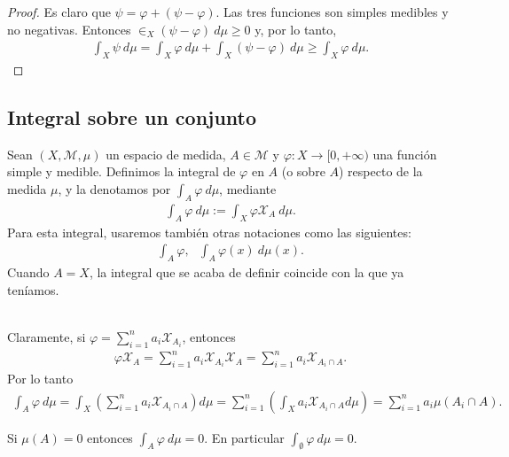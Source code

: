 \begin{proof}
Es claro que $\psi = \varphi + (\psi - \varphi)$. Las tres funciones son simples medibles y no negativas. Entonces $\in_{X}{(\psi - \varphi) \ d\mu} \ge 0$ y, por lo tanto,
\begin{align*}
    \int_{X}{\psi \ d\mu} = \int_{X}{\varphi \ d\mu} + \int_{X}{(\psi - \varphi) \ d\mu} \ge \int_{X}{\varphi \ d\mu}.
\end{align*}
\end{proof}

\subsection{Integral sobre un conjunto}

\begin{defi}
Sean $(X, \mathcal{M}, \mu)$ un espacio de medida, $A \in \mathcal{M}$ y $\varphi: X \longrightarrow [0, +\infty)$ una función simple y medible. Definimos la integral de $\varphi$ en $A$ (o sobre $A$) respecto de la medida $\mu$, y la denotamos por $\int_{A}{\varphi \ d\mu}$, mediante
\begin{align*}
    \int_{A}{\varphi \ d\mu} := \int_{X}{\varphi \mathcal{X}_A \ d\mu}.
\end{align*}
Para esta integral, usaremos también otras notaciones como las siguientes:
\begin{align*}
    \int_{A}{\varphi}, \ \ \ \int_{A}{\varphi(x) \ d\mu(x)}.
\end{align*}
Cuando $A = X$, la integral que se acaba de definir coincide con la que ya teníamos.
\end{defi}
\\
\newline
Claramente, si $\varphi = \sum_{i=1}^{n}{a_i \mathcal{X}_{A_i}}$, entonces
\begin{align*}
    \varphi \mathcal{X}_A = \sum_{i=1}^{n}{a_i \mathcal{X}_{A_i} \mathcal{X}_A} = \sum_{i=1}^{n}{a_i \mathcal{X}_{A_i \cap A}}.
\end{align*}
Por lo tanto
\begin{align*}
    \int_{A}{\varphi \ d\mu} = \int_{X}{\left( \sum_{i=1}^{n}{a_i \mathcal{X}_{A_i \cap A}} \right) d\mu} =  \sum_{i=1}^{n}{\left( \int_{X}{a_i \mathcal{X}_{A_i \cap A} d\mu}\right)} =  \sum_{i=1}^{n}{a_i\mu(A_i\cap A)}.
\end{align*}

\begin{obs}
\label{obs:vacio}
Si $\mu(A) = 0$ entonces $\int_{A}{\varphi \ d\mu} = 0$. En particular $\int_{\emptyset}{\varphi \ d\mu}  =0$.
\end{obs}

